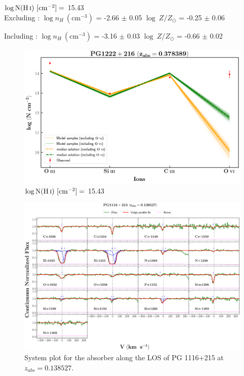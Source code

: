   $\log \text{N}(\ion{H}{i}) \ [\text{cm}^{-2}]=$ 15.43 \\
  
  Excluding  : $\log n_H \ (\text{cm}^{-3})$ = -2.66 $\pm$ 0.05 \hspace{10mm} $\log \ Z/Z_\odot$ = -0.25 $\pm$ 0.06
  
  Including  : $\log n_H \ (\text{cm}^{-3})$ = -3.16 $\pm$ 0.03 \hspace{10mm} $\log \ Z/Z_\odot$ = -0.66 $\pm$ 0.02
  
  \newpage
  
  \begin{figure}[!h]
    \centering
    \includegraphics[width=0.9\linewidth]{Ionisation-Modelling-Plots/pg1222-z=0.378389-compVI.png}
    \caption{$\log \text{N}(\ion{H}{i}) \ [\text{cm}^{-2}]=$ 15.43}
  \end{figure}
  
  
  \newpage
  
  \begin{landscape}
  
  \begin{figure}
      \centering
      \vspace{-20mm}
      \hspace*{-35mm}
      \includegraphics[width=1.25\linewidth]{System-Plots/PG1116+215_z=0.138527_sys_plot.png}
      \caption{System plot for the absorber along the LOS of PG 1116+215 at $z_{abs} = 0.138527$. }
  \end{figure}
  
  \end{landscape}
  

